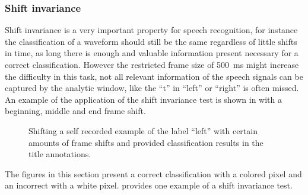 \subsubsection{Shift invariance}
Shift invariance is a very important property for speech recognition, for instance the classification of a waveform should still be the same regardless of little shifts in time, as long there is enough and valuable information present necessary for a correct classification.
However the restricted frame size of \SI{500}{\milli\second} might increase the difficulty in this task, not all relevant information of the speech signals can be captured by the analytic window, like the \enquote{t} in \enquote{left} or \enquote{right} is often missed.
An example of the application of the shift invariance test is shown in  with a beginning, middle and end frame shift.
\begin{figure}[!ht]
  \centering
  \caption{Shifting a self recorded example of the label \enquote{left} with certain amounts of frame shifts and provided classification results in the title annotations.}
  \label{fig:exp_details_tb_shift_left}
\end{figure}
\FloatBarrier
\noindent
The figures in this section present a correct classification with a colored pixel and an incorrect with a white pixel.
 provides one example of a shift invariance test.
